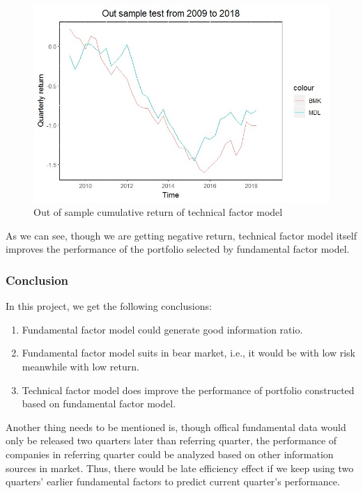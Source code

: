 \documentclass[]{article}
\begin{document}
\begin{figure}[H]
\begin{center}
\includegraphics[width=5in]{Lab//full_model_cumu.jpg}
\caption{Out of sample cumulative return of technical factor model}
\label{figure17}
\end{center}
\end{figure}

As we can see, though we are getting negative return, technical factor
model itself improves the performance of the portfolio selected by
fundamental factor model.

\hypertarget{conclusion}{%
\subsubsection{Conclusion}\label{conclusion}}

In this project, we get the following conclusions:

\begin{enumerate}
\def\labelenumi{\arabic{enumi}.}
\item
  Fundamental factor model could generate good information ratio.
\item
  Fundamental factor model suits in bear market, i.e., it would be with
  low risk meanwhile with low return.
\item
  Technical factor model does improve the performance of portfolio
  constructed based on fundamental factor model.
\end{enumerate}

Another thing needs to be mentioned is, though offical fundamental data
would only be released two quarters later than referring quarter, the
performance of companies in referring quarter could be analyzed based on
other information sources in market. Thus, there would be late
efficiency effect if we keep using two quarters' earlier fundamental
factors to predict current quarter's performance.
\end{document}
